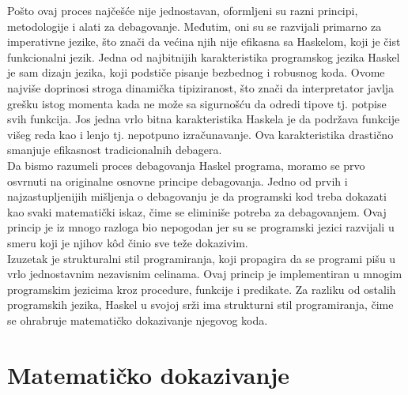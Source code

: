 \documentclass[a4paper]{article}
\begin{document}
{{Pošto ovaj proces najčešće nije jednostavan, oformljeni su razni principi, metodologije i alati za debagovanje. Međutim, oni su se razvijali primarno za imperativne jezike, što znači da većina njih nije efikasna sa Haskelom, koji je čist funkcionalni jezik. Jedna od najbitnijih karakteristika programskog jezika Haskel je sam dizajn jezika, koji podstiče pisanje bezbednog i robusnog koda. Ovome najviše doprinosi stroga dinamička tipiziranost, što znači da interpretator javlja grešku istog momenta kada ne može sa sigurnošću da odredi tipove tj. potpise svih funkcija. Jos jedna vrlo bitna karakteristika Haskela je da podržava funkcije višeg reda kao i lenjo tj. nepotpuno izračunavanje. Ova karakteristika drastično smanjuje efikasnost tradicionalnih debagera\cite{pope2006declarative}.\\

Da bismo razumeli proces debagovanja Haskel programa, moramo se prvo osvrnuti na originalne osnovne principe debagovanja. Jedno od prvih i najzastupljenijih mišljenja o debagovanju je da programski kod treba dokazati kao svaki matematički iskaz, čime se eliminiše potreba za debagovanjem. Ovaj princip je iz mnogo razloga bio nepogodan jer su se programski jezici razvijali u smeru koji je njihov k\^{o}d činio sve teže dokazivim\cite{pope2006declarative}. \\

Izuzetak je strukturalni stil programiranja, koji propagira da se programi pišu u vrlo jednostavnim nezavisnim celinama. Ovaj princip je implementiran u mnogim programskim jezicima kroz procedure, funkcije i predikate. Za razliku od ostalih programskih jezika, Haskel u svojoj srži ima strukturni stil programiranja, čime se ohrabruje matematičko dokazivanje njegovog koda\cite{pope2006declarative}.

\section{Matematičko dokazivanje}

}}
\end{document}

